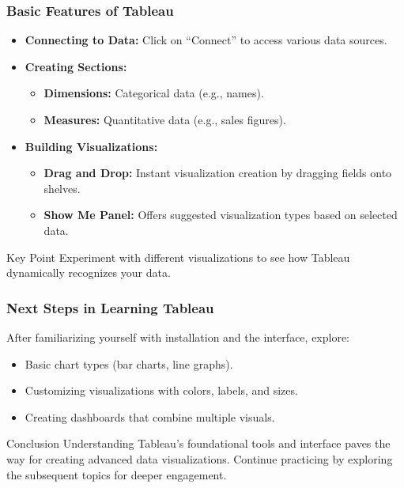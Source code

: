 \documentclass{beamer}
\begin{document}
\begin{frame}[fragile]
    \frametitle{Basic Features of Tableau}
    \begin{itemize}
        \item \textbf{Connecting to Data:} Click on “Connect” to access various data sources.
        \item \textbf{Creating Sections:}
        \begin{itemize}
            \item \textbf{Dimensions:} Categorical data (e.g., names).
            \item \textbf{Measures:} Quantitative data (e.g., sales figures).
        \end{itemize}
        \item \textbf{Building Visualizations:}
        \begin{itemize}
            \item \textbf{Drag and Drop:} Instant visualization creation by dragging fields onto shelves.
            \item \textbf{Show Me Panel:} Offers suggested visualization types based on selected data.
        \end{itemize}
    \end{itemize}
    
    \begin{block}{Key Point}
        Experiment with different visualizations to see how Tableau dynamically recognizes your data.
    \end{block}
\end{frame}

\begin{frame}[fragile]
    \frametitle{Next Steps in Learning Tableau}
    After familiarizing yourself with installation and the interface, explore:
    \begin{itemize}
        \item Basic chart types (bar charts, line graphs).
        \item Customizing visualizations with colors, labels, and sizes.
        \item Creating dashboards that combine multiple visuals.
    \end{itemize}
    
    \begin{block}{Conclusion}
        Understanding Tableau's foundational tools and interface paves the way for creating advanced data visualizations. Continue practicing by exploring the subsequent topics for deeper engagement.
    \end{block}
\end{frame}
\end{document}

